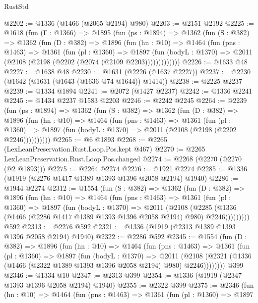\begin{lexlean}{RustStd}
\begin{coremodule}
@2202 := @1336 (@1466 (@2065 @2194) @980)
@2203 := @2151 @2192
@2225 := @1618
    (fun (Γ : @1366) =>
    @1895
      (fun (ps : @1894) =>
      @1362
        (fun (S : @382) =>
        @1362
          (fun (D : @382) =>
          @1896
            (fun (hn : @10) =>
            @1464
              (fun (pns : @1463) =>
              @1361
                (fun (pl : @1360) =>
                @1897
                  (fun (bodyL : @1370) =>
                  @2011 (@2108 (@2198 (@2202 (@2074 (@2109 @2203)))))))))))))
@2226 := @1633 @48
@2227 := @1638 @48
@2230 := @1631 (@2226 (@1637 @2227))
@2237 := @2230 (@1642 (@1631 (@1643 (@1636 @74 @1644)) @1414))
@2238 := @2225 @2237
@2239 := @1334 @1894
@2241 := @2072 (@1427 @2237)
@2242 := @1336 @2241
@2245 := @1434 @2237 @1583 @2203
@2246 := @2242 @2245
@2264 := @2239
    (fun (ps : @1894) =>
    @1362
      (fun (S : @382) =>
      @1362
        (fun (D : @382) =>
        @1896
          (fun (hn : @10) =>
          @1464
            (fun (pns : @1463) =>
            @1361
              (fun (pl : @1360) =>
              @1897 (fun (bodyL : @1370) => @2011 (@2108 (@2198 (@2202 @2246))))))))))
@2265 := @6 @1893
@2268 := @2265 (LexLeanPreservation.Rust.Loop.Pos.kept @467)
@2270 := @2265 LexLeanPreservation.Rust.Loop.Pos.changed
@2274 := @2268 (@2270 (@2270 (@2 @1893)))
@2275 := @2264 @2274
@2276 := @1921 @2274
@2285 := @1336 (@1919 (@2276 @1417 @1389 @1393 @1396 @2058 @2194) @1940)
@2286 := @1944 @2274
@2312 := @1554
    (fun (S : @382) =>
    @1362
      (fun (D : @382) =>
      @1896
        (fun (hn : @10) =>
        @1464
          (fun (pns : @1463) =>
          @1361
            (fun (pl : @1360) =>
            @1897
              (fun (bodyL : @1370) =>
              @2011
                (@2108
                  (@2285
                    (@1336 (@1466 (@2286 @1417 @1389 @1393 @1396 @2058 @2194) @980) @2246)))))))))
    @592
@2313 := @2276 @592
@2321 := @1336 (@1919 (@2313 @1389 @1393 @1396 @2058 @2194) @1940)
@2322 := @2286 @592
@2345 := @1554
    (fun (D : @382) =>
    @1896
      (fun (hn : @10) =>
      @1464
        (fun (pns : @1463) =>
        @1361
          (fun (pl : @1360) =>
          @1897
            (fun (bodyL : @1370) =>
            @2011
              (@2108 (@2321 (@1336 (@1466 (@2322 @1389 @1393 @1396 @2058 @2194) @980) @2246))))))))
    @399
@2346 := @1334 @10
@2347 := @2313 @399
@2354 := @1336 (@1919 (@2347 @1393 @1396 @2058 @2194) @1940)
@2355 := @2322 @399
@2375 := @2346
    (fun (hn : @10) =>
    @1464
      (fun (pns : @1463) =>
      @1361
        (fun (pl : @1360) =>
        @1897

\end{coremodule}
\end{lexlean}
